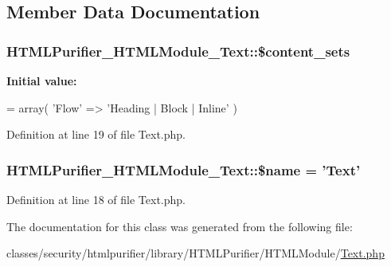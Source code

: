 \subsection{Member Data Documentation}
\hypertarget{classHTMLPurifier__HTMLModule__Text_aedeade1f8f771d4090555b0f214b2901}{
\subsubsection[{\$content\+\_\+sets}]{\setlength{\rightskip}{0pt plus 5cm}H\+T\+M\+L\+Purifier\+\_\+\+H\+T\+M\+L\+Module\+\_\+\+Text\+::\$content\+\_\+sets}}\label{classHTMLPurifier__HTMLModule__Text_aedeade1f8f771d4090555b0f214b2901}
{\bfseries Initial value\+:}
\begin{DoxyCode}
= array(
        \textcolor{stringliteral}{'Flow'} => \textcolor{stringliteral}{'Heading | Block | Inline'}
    )
\end{DoxyCode}


Definition at line 19 of file Text.\+php.

\hypertarget{classHTMLPurifier__HTMLModule__Text_a04cc02d4be360164113d399749c69cc1}{
\subsubsection[{\$name}]{\setlength{\rightskip}{0pt plus 5cm}H\+T\+M\+L\+Purifier\+\_\+\+H\+T\+M\+L\+Module\+\_\+\+Text\+::\$name = 'Text'}}\label{classHTMLPurifier__HTMLModule__Text_a04cc02d4be360164113d399749c69cc1}


Definition at line 18 of file Text.\+php.



The documentation for this class was generated from the following file\+:\begin{DoxyCompactItemize}
\item 
classes/security/htmlpurifier/library/\+H\+T\+M\+L\+Purifier/\+H\+T\+M\+L\+Module/\hyperlink{HTMLModule_2Text_8php}{Text.\+php}\end{DoxyCompactItemize}
